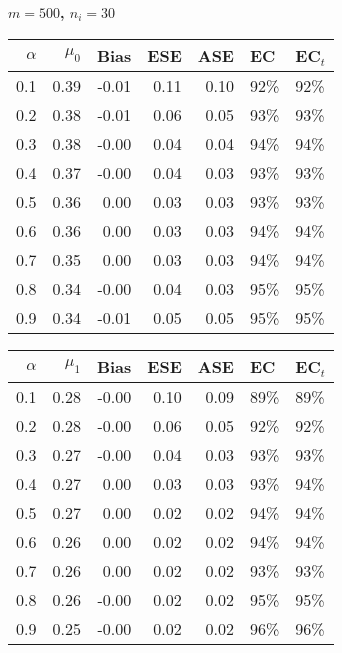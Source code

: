 \documentclass[12pt, letterpaper]{article}
\begin{document}
\clearpage   


\begin{center}
	\textbf{$m=500$, $n_i=30$} 
\end{center}
\begin{table}[ht!]
	\centering
	\bgroup
	\def\arraystretch{1.25}
	\setlength\tabcolsep{0.05in}
	\begin{tabular}{rrrrrll}
		\hline
		$\alpha$ & $\mu_0$ & Bias & ESE & ASE & EC & EC$_t$ \\ 
		\hline
		0.1 & 0.39 & -0.01 & 0.11 & 0.10 & 92\% & 92\% \\ 
		0.2 & 0.38 & -0.01 & 0.06 & 0.05 & 93\% & 93\% \\ 
		0.3 & 0.38 & -0.00 & 0.04 & 0.04 & 94\% & 94\% \\ 
		0.4 & 0.37 & -0.00 & 0.04 & 0.03 & 93\% & 93\% \\ 
		0.5 & 0.36 & 0.00 & 0.03 & 0.03 & 93\% & 93\% \\ 
		0.6 & 0.36 & 0.00 & 0.03 & 0.03 & 94\% & 94\% \\ 
		0.7 & 0.35 & 0.00 & 0.03 & 0.03 & 94\% & 94\% \\ 
		0.8 & 0.34 & -0.00 & 0.04 & 0.03 & 95\% & 95\% \\ 
		0.9 & 0.34 & -0.01 & 0.05 & 0.05 & 95\% & 95\% \\ 
		\hline
	\end{tabular}
	\egroup
	\quad 
	\bgroup
	\setlength\tabcolsep{0.05in}
	\def\arraystretch{1.25}
	\begin{tabular}{rrrrrll}
		\hline
		$\alpha$ & $\mu_1$ & Bias & ESE & ASE & EC & EC$_t$ \\
		\hline
		0.1 & 0.28 & -0.00 & 0.10 & 0.09 & 89\% & 89\% \\ 
		0.2 & 0.28 & -0.00 & 0.06 & 0.05 & 92\% & 92\% \\ 
		0.3 & 0.27 & -0.00 & 0.04 & 0.03 & 93\% & 93\% \\ 
		0.4 & 0.27 & 0.00 & 0.03 & 0.03 & 93\% & 94\% \\ 
		0.5 & 0.27 & 0.00 & 0.02 & 0.02 & 94\% & 94\% \\ 
		0.6 & 0.26 & 0.00 & 0.02 & 0.02 & 94\% & 94\% \\ 
		0.7 & 0.26 & 0.00 & 0.02 & 0.02 & 93\% & 93\% \\ 
		0.8 & 0.26 & -0.00 & 0.02 & 0.02 & 95\% & 95\% \\ 
		0.9 & 0.25 & -0.00 & 0.02 & 0.02 & 96\% & 96\% \\ 
		\hline
	\end{tabular}

\end{table}
\end{document}
